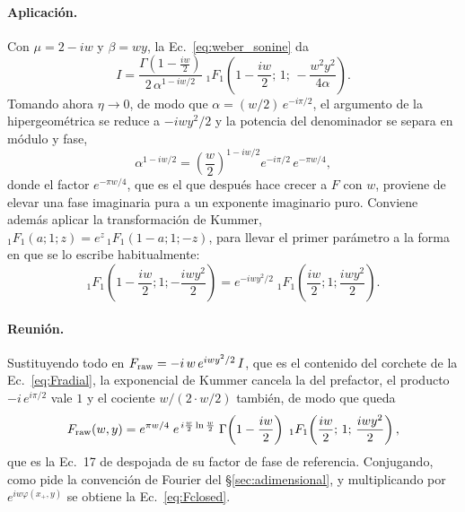 \documentclass[11pt,a4paper,openany]{book}
\begin{document}
\paragraph{Aplicaci\'on.} Con $\mu=2-iw$ y $\beta=wy$, la
Ec.~\eqref{eq:weber_sonine} da
\begin{equation}
  I=\frac{\Gamma\!\left(1-\frac{iw}{2}\right)}{2\,\alpha^{1-iw/2}}\;
  {}_1F_1\!\left(1-\frac{iw}{2};\,1;\,-\frac{w^{2}y^{2}}{4\alpha}\right) .
\end{equation}
Tomando ahora $\eta\to0$, de modo que $\alpha=(w/2)\,e^{-i\pi/2}$, el
argumento de la hipergeom\'etrica se reduce a $-iwy^{2}/2$ y la potencia del
denominador se separa en m\'odulo y fase,
\begin{equation}
  \alpha^{1-iw/2}
  =\left(\frac{w}{2}\right)^{1-iw/2}e^{-i\pi/2}\,e^{-\pi w/4} ,
  \label{eq:branch}
\end{equation}
donde el factor $e^{-\pi w/4}$, que es el que despu\'es hace crecer a $F$ con
$w$, proviene de elevar una fase imaginaria pura a un exponente imaginario
puro. Conviene adem\'as aplicar la transformaci\'on de Kummer,
${}_1F_1(a;1;z)=e^{z}\,{}_1F_1(1-a;1;-z)$, para llevar el primer par\'ametro a
la forma en que se lo escribe habitualmente:
\begin{equation}
  {}_1F_1\!\left(1-\frac{iw}{2};1;-\frac{iwy^{2}}{2}\right)
  =e^{-iwy^{2}/2}\;
  {}_1F_1\!\left(\frac{iw}{2};1;\frac{iwy^{2}}{2}\right) .
\end{equation}

\paragraph{Reuni\'on.} Sustituyendo todo en
$F_{\rm raw}=-i\,w\,e^{iwy^{2}/2}\,I$, que es el contenido del corchete de la
Ec.~\eqref{eq:Fradial}, la exponencial de Kummer cancela la del prefactor, el
producto $-i\,e^{i\pi/2}$ vale $1$ y el cociente $w/(2\cdot w/2)$ tambi\'en,
de modo que queda
\begin{equation}
  F_{\rm raw}(w,y)=e^{\pi w/4}\;e^{\,i\frac{w}{2}\ln\frac{w}{2}}\;
  \Gamma\!\left(1-\frac{iw}{2}\right)\;
  {}_1F_1\!\left(\frac{iw}{2};\,1;\,\frac{iwy^{2}}{2}\right) ,
  \label{eq:Fraw_closed}
\end{equation}
que es la Ec.~17 de \citet{Takahashi2003} despojada de su factor de fase de
referencia. Conjugando, como pide la convenci\'on de Fourier del
\S\ref{sec:adimensional}, y multiplicando por $e^{iw\varphi(x_+,y)}$ se obtiene
la Ec.~\eqref{eq:Fclosed}.
\end{document}
